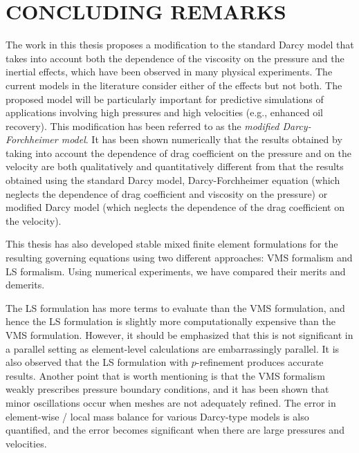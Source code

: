 \documentclass[11pt,reqno]{amsart}
\begin{document}
\section{CONCLUDING REMARKS}
\label{Ch:Conclusions}

The work in this thesis proposes a modification to the 
standard Darcy model that takes into account both the 
dependence of the viscosity on the pressure and the 
inertial effects, which have been observed in many 
physical experiments. The current models in the 
literature consider either of the effects but not 
both. The proposed model will be particularly important 
for predictive simulations of applications involving 
high pressures and high velocities (e.g., enhanced oil 
recovery). This modification has been referred to as the 
\emph{modified Darcy-Forchheimer model}. 
It has been shown numerically that the results obtained by 
taking into account the dependence of drag coefficient 
on the pressure and on the velocity are both qualitatively 
and quantitatively different from that the results obtained 
using the standard Darcy model, Darcy-Forchheimer equation 
(which neglects the dependence of drag coefficient and 
viscosity on the pressure) or modified Darcy model 
\cite{Nakshatrala_Rajagopal_IJNMF_2011_v67_p342,
Nakshatrala_Turner_2013_arXiv} (which neglects the 
dependence of the drag coefficient on the velocity). 

This thesis has also developed stable mixed finite element formulations 
for the resulting governing equations using two different 
approaches: VMS formalism and LS formalism. Using numerical experiments, 
we have compared their merits and demerits. 


The LS formulation has more terms to evaluate than the VMS formulation, 
and hence the LS formulation is slightly more computationally expensive 
than the VMS formulation. However, it should be emphasized that this is 
not significant in a parallel setting as element-level calculations are 
embarrassingly parallel. It is also observed that the LS formulation 
with $p$-refinement produces accurate results. Another point that is 
worth mentioning is that the VMS formalism weakly prescribes pressure 
boundary conditions, and it has been shown that minor oscillations occur 
when meshes are not adequately refined. The error in element-wise / local 
mass balance for various Darcy-type models is also quantified, and the error 
becomes significant when there are large pressures and velocities. 
\end{document}
